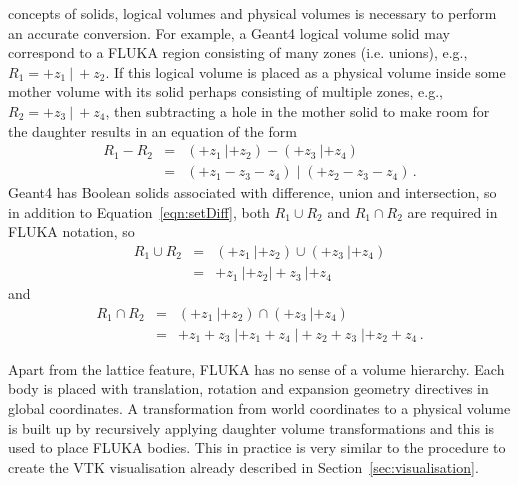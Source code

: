 \documentclass[preprint,12pt]{elsarticle}
\begin{document}
concepts of solids, logical volumes and physical volumes is necessary
to perform an accurate conversion.  For example, a Geant4 logical volume
solid may correspond to a FLUKA region consisting of many zones
(i.e. unions), e.g.,~$R_1 = +z_1\: |~+z_2$.  If this logical volume is
placed as a physical volume inside some mother volume with its solid
perhaps consisting of multiple zones, e.g., $R_2= +z_3 \: |~+z_4$, then
subtracting a hole in the mother solid to make room for the daughter
results in an equation of the form
\begin{equation}
  \begin{aligned}
R_1 - R_2 	& = & (+z_1 \: | +z_2) - ( +z_3 \: | +z_4) 			\\
			& = & (+z_1 - z_3 - z_4) \;  | \; (+z_2 - z_3 - z_4)\,.
\label{eqn:setDiff}
  \end{aligned}
\end{equation}
Geant4 has Boolean solids associated with difference, union and intersection, so in addition to
Equation~\ref{eqn:setDiff}, both $R_1 \cup R_2$ and $R_1 \cap R_2$ are required in FLUKA notation, so
\begin{equation}
  \begin{aligned}
R_1 \cup R_2 	& = & (+z_1 \: | +z_2)  \cup ( +z_3 \: | +z_4) \\
			& = & +z_1 \: | +z_2 |  +z_3 \: | +z_4
\label{eqn:setUnion}
\end{aligned}
\end{equation}
and
\begin{equation}
  \begin{aligned}
    R_1 \cap R_2 	& = & (+z_1 \: | +z_2) \cap ( +z_3 \: | +z_4) \\
			& = & +z_1 +z_3  \; | +z_1 +z_4 \; | +z_2 +z_3 \; | +z_2 +z_4\,.
  \end{aligned}
\label{eqn:setIntersection}
\end{equation}

Apart from the lattice feature, FLUKA has no sense of a volume hierarchy. Each body is placed with
translation, rotation and expansion geometry directives in global coordinates. A transformation from world
coordinates to a physical volume is built up by recursively applying daughter volume transformations
and  this is used to place FLUKA bodies. This  in practice is very similar to the procedure to create the
VTK visualisation already described in Section~\ref{sec:visualisation}.
\end{document}
